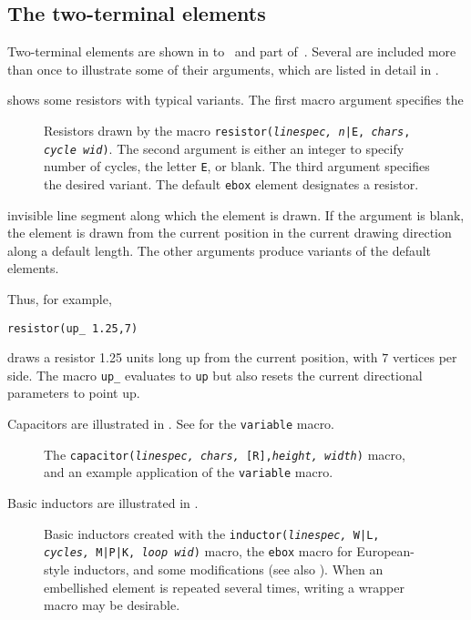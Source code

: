 \subsection{The two-terminal elements\label{Twoterminal:}}
Two-terminal elements are shown in
 to~ and part of~.
Several are included more than once to illustrate
some of their arguments, which are listed in detail in .

\enlargethispage{\baselineskip}
 shows some resistors with typical variants.
The first macro argument specifies the
\begin{figure}[H]
   
   \caption{Resistors drawn by the macro
   {\tt resistor({\sl linespec, n}|E, {\sl chars}, {\sl cycle wid})}.
   The second argument is either an integer to specify number of cycles,
   the letter {\tt E}, or blank. The third argument specifies the desired
   variant.
   The default {\tt ebox} element designates a resistor.}
   \label{Resistors}
   \end{figure}
\noindent%
invisible line segment along which the element is drawn.
If the argument is blank,
the element is drawn from the current position in the current drawing
direction along a default length.
The other arguments produce variants of the default elements.

Thus, for example,
\par
{\tt resistor(up\_ 1.25,7)}
\par
\noindent%
draws a resistor 1.25 units long up from the current position, with $7$
vertices per side.
The macro {\tt up\_} evaluates to {\tt up} but also resets the current
directional parameters to point up.

Capacitors are illustrated in .
See  for the {\tt variable} macro.
\begin{figure}[h!t]
   
   \caption{The {\tt capacitor({\sl linespec, chars,} [R],{\sl height, width})}
      macro, and an example application of the {\tt variable} macro.}
   \label{Capacitors}
    \end{figure}

Basic inductors are illustrated in .
\begin{figure}[h!]
   
   \caption{Basic inductors created with the
    {\tt inductor({\sl linespec,} W|L, {\sl cycles,} M|P|K, {\sl loop wid})}
    macro, the {\tt ebox} macro for European-style inductors, and some
    modifications (see also ).
    When an embellished element is repeated several times,
    writing a wrapper macro may be desirable.}
   \label{Inductors}
    \end{figure}

